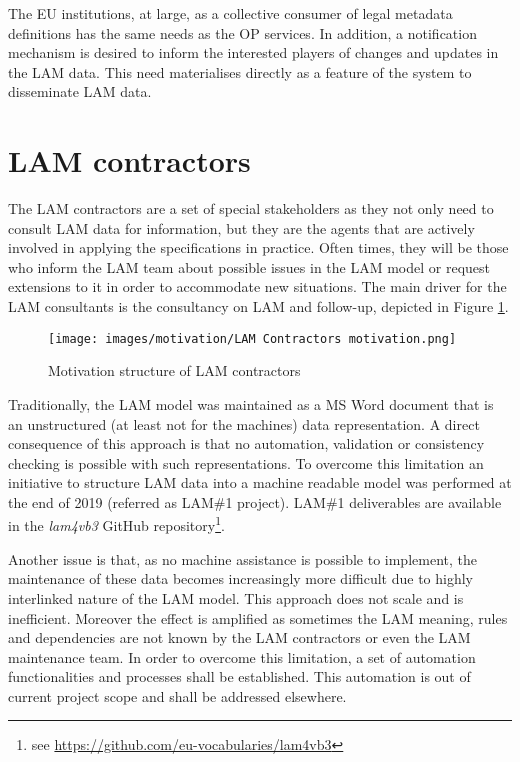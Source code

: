	The EU institutions, at large, as a collective consumer of legal metadata definitions has the same needs as the OP services. In addition, a notification mechanism is desired to inform the interested players of changes and updates in the LAM data. This need materialises directly as a feature of the system to disseminate LAM data. 
	
	\section{LAM contractors}

	The LAM contractors are a set of special stakeholders as they not only need to consult LAM data for information, but they are the agents that are actively involved in applying the specifications in practice. Often times, they will be those who inform the LAM team about possible issues in the LAM model or request extensions to it in order to accommodate new situations. The main driver for the LAM consultants is the consultancy on LAM and follow-up, depicted in Figure \ref{fig:motivation-lam-contractors}. 
		 	
	\begin{figure}[h]
		\centering
		\texttt{[image: images/motivation/LAM Contractors motivation.png]}
		\caption{Motivation structure of LAM contractors}
		\label{fig:motivation-lam-contractors}
	\end{figure}

	Traditionally, the LAM model was maintained as a MS Word document that is an unstructured (at least not for the machines) data representation. A direct consequence of this approach is that no automation, validation or consistency checking is possible with such representations. To overcome this limitation an initiative to structure LAM data into a machine readable model was performed at the end of 2019 (referred as LAM\#1 project). LAM\#1 deliverables are available in the \textit{lam4vb3} GitHub repository\footnote{see \url{https://github.com/eu-vocabularies/lam4vb3}}.
		
	Another issue is that, as no machine assistance is possible to implement, the maintenance of these data becomes increasingly more difficult due to highly interlinked nature of the LAM model. This approach does not scale and is inefficient. 
	Moreover the effect is amplified as sometimes the LAM meaning, rules and dependencies are not known by the LAM contractors or even the LAM maintenance team. In order to overcome this limitation, a set of automation functionalities and processes shall be established. This automation is out of current project scope and shall be addressed elsewhere. 
	

